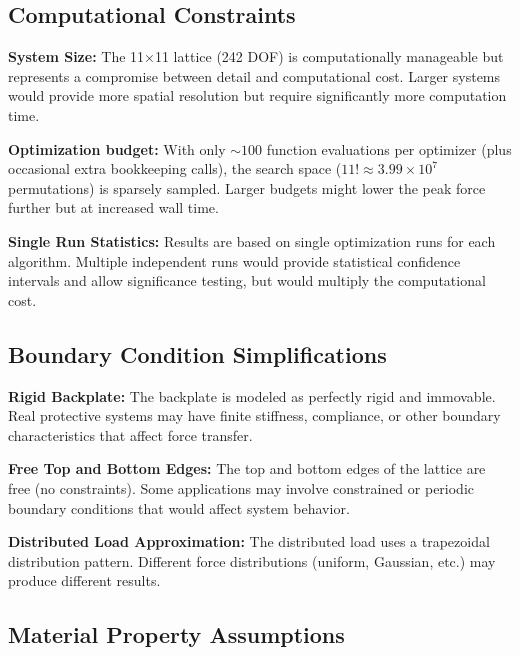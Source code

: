 \documentclass[11pt,a4paper]{article}
\begin{document}
\subsection{Computational Constraints}

\noindent \textbf{System Size:} The 11×11 lattice (242 DOF) is computationally manageable but represents a compromise between detail and computational cost. Larger systems would provide more spatial resolution but require significantly more computation time. \newline

\noindent \textbf{Optimization budget:} With only $\sim 100$ function evaluations per optimizer (plus occasional extra bookkeeping calls), the search space ($11! \approx 3.99 \times 10^{7}$ permutations) is sparsely sampled. Larger budgets might lower the peak force further but at increased wall time. \newline

\noindent \textbf{Single Run Statistics:} Results are based on single optimization runs for each algorithm. Multiple independent runs would provide statistical confidence intervals and allow significance testing, but would multiply the computational cost. \newline

\subsection{Boundary Condition Simplifications}

\noindent \textbf{Rigid Backplate:} The backplate is modeled as perfectly rigid and immovable. Real protective systems may have finite stiffness, compliance, or other boundary characteristics that affect force transfer. \newline

\noindent \textbf{Free Top and Bottom Edges:} The top and bottom edges of the lattice are free (no constraints). Some applications may involve constrained or periodic boundary conditions that would affect system behavior. \newline

\noindent \textbf{Distributed Load Approximation:} The distributed load uses a trapezoidal distribution pattern. Different force distributions (uniform, Gaussian, etc.) may produce different results. \newline

\subsection{Material Property Assumptions}
\end{document}
